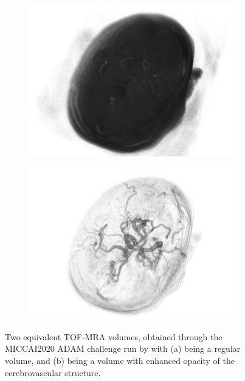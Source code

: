 \begin{figure}[htp]
	\centering
	\begin{subfigure}{0.45\linewidth}
		\includegraphics[width=\linewidth]{figures/tof-mra-3d-noenhance.png}
		\caption{}
		\label{fig:tof-mra-3d-noenhance.png}
	\end{subfigure}
	\begin{subfigure}{0.45\linewidth}
		\includegraphics[width=\linewidth]{figures/tof-mra-3d.png}
		\caption{}
		\label{fig:tof-mra-3d.png}
	\end{subfigure}
	\caption[3D TOF-MRA volume]{Two equivalent TOF-MRA volumes, obtained through the MICCAI2020 ADAM challenge run by \citeauthor{Timmins2020} with (a) being a regular volume, and (b) being a volume with enhanced opacity of the cerebrovascular structure.}
\end{figure}

